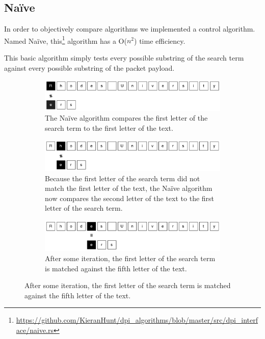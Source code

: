 \documentclass{article}
\begin{document}
\subsection{Na{\"i}ve} \label{sec:naive}
In order to objectively compare algorithms we implemented a control algorithm. Named Na{\"i}ve, this\footnote{\url{https://github.com/KieranHunt/dpi_algorithms/blob/master/src/dpi_interface/naive.rs}} algorithm has a O(\(n^2\)) time efficiency.

This basic algorithm simply tests every possible substring of the search term against every possible substring of the packet payload.

\begin{figure}[h!bt]
  \label{fig:naive}
  \centering
  
  \begin{subfigure}{\textwidth}
  \makeatletter
  \includegraphics[width=\textwidth]{images/naive-1}
  \caption{The Na{\"i}ve algorithm compares the first letter of the search term to the first letter of the text.}
  \end{subfigure}
  
  \begin{subfigure}{\textwidth}
  \makeatletter
  \includegraphics[width=\textwidth]{images/naive-2}
  \caption{Because the first letter of the search term did not match the first letter of the text, the Na{\"i}ve algorithm now compares the second letter of the text to the first letter of the search term.}
  \end{subfigure}
  
  \begin{subfigure}{\textwidth}
  \makeatletter
  \includegraphics[width=\textwidth]{images/naive-3}
  \caption{After some iteration, the first letter of the search term is matched against the fifth letter of the text.}
  \end{subfigure}
  

\end{figure}
\end{document}
